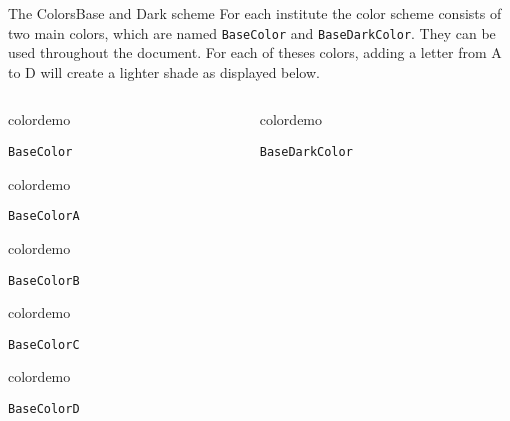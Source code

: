 \begin{frame}{The Colors}{Base and Dark scheme}
For each institute the color scheme consists of two main colors, which are named 
\texttt{BaseColor} and \texttt{BaseDarkColor}. They can be used throughout the document. For each of theses colors, adding a letter from A to D will create a lighter shade as displayed below.
%
%
%
%
%
\newdimen\bwidth
\setlength{\bwidth}{0.35\textwidth}
\vspace{1em}%
\begin{columns}
\begin{column}{0.45\textwidth}
\begin{beamercolorbox}[dp=0pt,sep=0em,wd=\bwidth,ht=10cm]{}
%
\begin{beamercolorbox}[sep=0em,wd=2cm,ht=2cm]{colordemo}%
\end{beamercolorbox}\quad\texttt{BaseColor}\newline%
%
\begin{beamercolorbox}[sep=0em,wd=2cm,ht=2cm]{colordemo}
\end{beamercolorbox}\quad\texttt{BaseColorA}\hfill\newline%
%
\begin{beamercolorbox}[sep=0em,wd=2cm,ht=2cm]{colordemo}%
\end{beamercolorbox}\quad\texttt{BaseColorB}\hfill\newline%
%
\begin{beamercolorbox}[sep=0em,wd=2cm,ht=2cm]{colordemo}%
\end{beamercolorbox}\quad\texttt{BaseColorC}\hfill\newline%
%
\begin{beamercolorbox}[sep=0em,wd=2cm,ht=2cm]{colordemo}%
\end{beamercolorbox}\quad\texttt{BaseColorD}%
\end{beamercolorbox}%
\end{column}
%
% 
%
\begin{column}{0.45\textwidth}
\begin{beamercolorbox}[dp=0pt,sep=0em,wd=\bwidth,ht=10cm]{}
%
\begin{beamercolorbox}[sep=0em,wd=2cm,ht=2cm]{colordemo}%
\end{beamercolorbox}\quad\texttt{BaseDarkColor}\newline%

\end{beamercolorbox}
\end{column}
\end{columns}
\end{frame}
